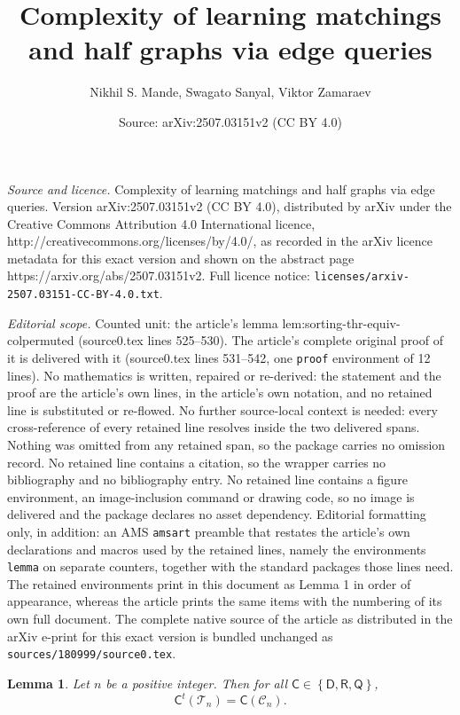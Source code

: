 \documentclass[10pt,a4paper]{amsart}
\title{Complexity of learning matchings and half graphs via edge queries}
\author{Nikhil S. Mande, Swagato Sanyal, Viktor Zamaraev}
\date{Source: arXiv:2507.03151v2 (CC BY 4.0)}
\newtheorem{lemma}{Lemma}
\newcommand{\cC}{\mathcal{C}}
\newcommand{\cT}{\mathcal{T}}
\newcommand{\cbra}[1]{\left\{#1\right\}}
\newcommand{\sC}{\mathsf{C}}
\newcommand{\sD}{\mathsf{D}}
\newcommand{\sQ}{\mathsf{Q}}
\newcommand{\sR}{\mathsf{R}}
\begin{document}
\maketitle

\noindent\emph{Source and licence.} Complexity of learning matchings and half graphs via edge queries. Version arXiv:2507.03151v2 (CC BY 4.0), distributed by arXiv under the Creative Commons Attribution 4.0 International licence, http://creativecommons.org/licenses/by/4.0/, as recorded in the arXiv licence metadata for this exact version and shown on the abstract page https://arxiv.org/abs/2507.03151v2. Full licence notice: \texttt{licenses/arxiv-2507.03151-CC-BY-4.0.txt}.\par\smallskip

\noindent\textit{Editorial scope.} Counted unit: the article's lemma lem:sorting-thr-equiv-colpermuted (source0.tex lines 525--530). The article's complete original proof of it is delivered with it (source0.tex lines 531--542, one \texttt{proof} environment of 12 lines). No mathematics is written, repaired or re-derived: the statement and the proof are the article's own lines, in the article's own notation, and no retained line is substituted or re-flowed.  No further source-local context is needed: every cross-reference of every retained line resolves inside the two delivered spans.  Nothing was omitted from any retained span, so the package carries no omission record.  No retained line contains a citation, so the wrapper carries no bibliography and no bibliography entry.  No retained line contains a figure environment, an image-inclusion command or drawing code, so no image is delivered and the package declares no asset dependency.  Editorial formatting only, in addition: an AMS \texttt{amsart} preamble that restates the article's own declarations and macros used by the retained lines, namely the environments \texttt{lemma} on separate counters, together with the standard packages those lines need.  The retained environments print in this document as Lemma 1 in order of appearance, whereas the article prints the same items with the numbering of its own full document.  The complete native source of the article as distributed in the arXiv e-print for this exact version is bundled unchanged as \texttt{sources/180999/source0.tex}.
\begin{lemma}\label{lem:sorting-thr-equiv-colpermuted}
    Let $n$ be a positive integer. Then for all $\sC \in \cbra{\sD, \sR, \sQ}$,
    $$
    \sC^t(\cT_n) = \sC(\cC_n).
    $$
\end{lemma}
\end{document}
